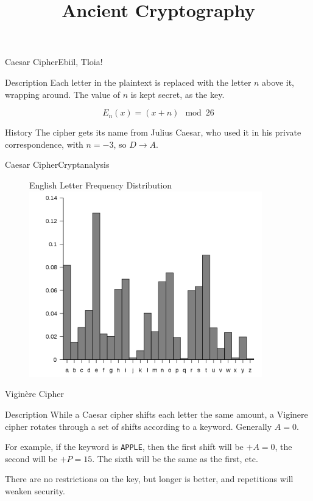 \documentclass{beamer}
\title{Ancient Cryptography}
\begin{document}
\begin{frame}
	\titlepage
\end{frame}

\begin{frame}{Caesar Cipher}{Ebiil, Tloia!}
	\begin{block}{Description}
		Each letter in the plaintext is replaced with the letter $n$ above it,
		wrapping around. The value of $n$ is kept secret, as the key.

		\[ E_n(x) = (x+n)\mod 26 \]
	\end{block}

	\begin{block}{History}
		The cipher gets its name from Julius Caesar, who used it in his private
		correspondence, with $n = -3$, so $D \rightarrow A$.
	\end{block}
\end{frame}

\begin{frame}{Caesar Cipher}{Cryptanalysis}
	\begin{figure}
		{\centering English Letter Frequency Distribution}
		\includegraphics[width=0.9\textwidth]{letter-frequency.png}
	\end{figure}
\end{frame}

\begin{frame}{Vigin\`ere Cipher}
	\begin{block}{Description}
		While a Caesar cipher shifts each letter the same amount, a Viginere
		cipher rotates through a set of shifts according to a keyword. Generally
		$A=0$.
	\end{block}

	For example, if the keyword is {\tt APPLE}, then the first shift will be
	$+A = 0$, the second will be $+P = 15$. The sixth will be the same as the
	first, etc.

	There are no restrictions on the key, but longer is better, and repetitions
	will weaken security.
\end{frame}
\end{document}
